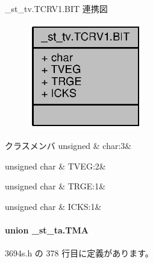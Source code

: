 \+\_\+st\+\_\+tv.\+T\+C\+R\+V1.\+B\+I\+T 連携図
\nopagebreak
\begin{figure}[H]
\begin{center}
\leavevmode
\includegraphics[width=141pt]{dd/d3f/struct__st__tv_8TCRV1_8BIT__coll__graph}
\end{center}
\end{figure}
\begin{DoxyFields}{クラスメンバ}
unsigned\label{3694s_8h_aa87deb01c5f539e6bda34829c8ef2368}
&
char\+:3&
\\
\hline

unsigned char\label{3694s_8h_ab2abe69921ad02d28976ad68e68aaee1}
&
T\+V\+E\+G\+:2&
\\
\hline

unsigned char\label{3694s_8h_a899687deda79b404dc72076da2c1ac1f}
&
T\+R\+G\+E\+:1&
\\
\hline

unsigned char\label{3694s_8h_a0b2db52444cd9d1fe4ef0878fba6ebe9}
&
I\+C\+K\+S\+:1&
\\
\hline

\end{DoxyFields}
\label{union__st__ta_8TMA}
\paragraph{union \+\_\+st\+\_\+ta.\+T\+M\+A}


 3694s.\+h の 378 行目に定義があります。



